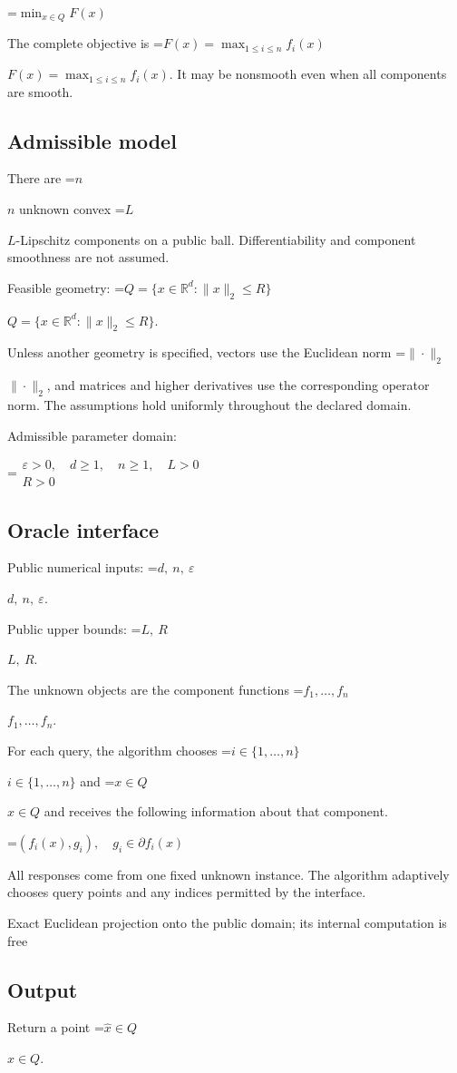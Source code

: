 \documentclass[10pt,a4paper]{article}
\newcommand{\AtlasMath}[1]{\par\begingroup\centering\setbox0=\hbox{$\displaystyle #1$}\ifdim\wd0>1.4\linewidth\typeout{ATLAS WIDE FORMULA: \the\wd0}\fi\ifdim\wd0>\linewidth\resizebox{\linewidth}{!}{\box0}\else\box0\fi\par\endgroup}
\newcommand{\AtlasInlineMath}[1]{\begingroup\setbox0=\hbox{$#1$}\ifdim\wd0>.4\linewidth\endgroup\AtlasMath{#1}\else\endgroup$#1$\fi}
\begin{document}
\AtlasMath{\min_{x\in Q}F(x)}


The complete objective is \AtlasInlineMath{F(x)=\max_{1\le i\le n}f_i(x)}. It may be nonsmooth even when all components are smooth.

\subsection{Admissible model}
There are \AtlasInlineMath{n} unknown convex \AtlasInlineMath{L}-Lipschitz components on a public ball. Differentiability and component smoothness are not assumed.

Feasible geometry: \AtlasInlineMath{Q=\{x\in\mathbb{R}^d:\|x\|_2\le R\}}.

Unless another geometry is specified, vectors use the Euclidean norm \AtlasInlineMath{\|\cdot\|_2}, and matrices and higher derivatives use the corresponding operator norm. The assumptions hold uniformly throughout the declared domain.

Admissible parameter domain:


\AtlasMath{\begin{gathered}\varepsilon > 0,\quad d \ge 1,\quad n \ge 1,\quad L > 0\\R > 0\end{gathered}}


\subsection{Oracle interface}
Public numerical inputs: \AtlasInlineMath{d,\ n,\ \varepsilon}.

Public upper bounds: \AtlasInlineMath{L,\ R}.

The unknown objects are the component functions \AtlasInlineMath{f_1,\ldots,f_n}.

For each query, the algorithm chooses \AtlasInlineMath{i\in\{1,\ldots,n\}} and \AtlasInlineMath{x\in Q} and receives the following information about that component.


\AtlasMath{(f_i(x),g_i),\quad g_i\in\partial f_i(x)}


All responses come from one fixed unknown instance. The algorithm adaptively chooses query points and any indices permitted by the interface.

Exact Euclidean projection onto the public domain; its internal computation is free

\subsection{Output}
Return a point \AtlasInlineMath{\widehat x\in Q}.
\end{document}
